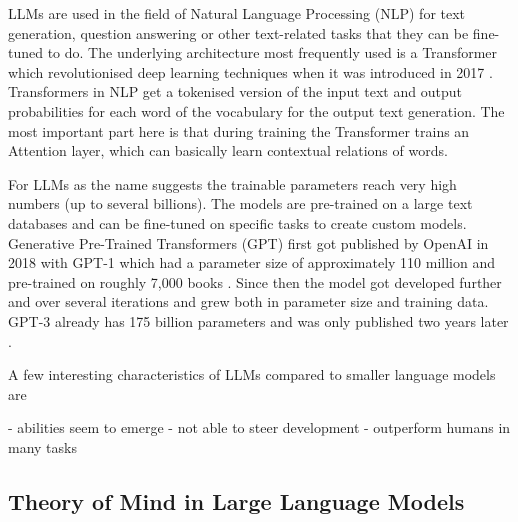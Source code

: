 LLMs are used in the field of Natural Language Processing (NLP) for text generation, question answering or other text-related tasks that they can be fine-tuned to do. The underlying architecture most frequently used is a Transformer which revolutionised deep learning techniques when it was introduced in 2017 \cite{attention}. Transformers in NLP get a tokenised version of the input text and output probabilities for each word of the vocabulary for the output text generation. The most important part here is that during training the Transformer trains an Attention layer, which can basically learn contextual relations of words.

For LLMs as the name suggests the trainable parameters reach very high numbers (up to several billions). The models are pre-trained on a large text databases and can be fine-tuned on specific tasks to create custom models. Generative Pre-Trained Transformers (GPT) first got published by OpenAI in 2018 with GPT-1 which had a parameter size of approximately 110 million and pre-trained on roughly 7,000 books \cite{gpt1}. Since then the model got developed further and over several iterations and grew both in parameter size and training data. GPT-3 already has 175 billion parameters and was only published two years later \cite{gpt3}.

A few interesting characteristics of LLMs compared to smaller language models are

- abilities seem to emerge
- not able to steer development
- outperform humans in many tasks
\subsection{Theory of Mind in Large Language Models}